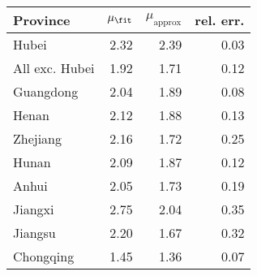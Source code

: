 \begin{tabular}{lrrr}
\hline
 Province       &   $\mu_{\mathrm{\fit}}$ &   $\mu_{\mathrm{approx}}$ &   rel. err. \\
\hline
 Hubei          &                    2.32 &                      2.39 &        0.03 \\
 All exc. Hubei &                    1.92 &                      1.71 &        0.12 \\
 Guangdong      &                    2.04 &                      1.89 &        0.08 \\
 Henan          &                    2.12 &                      1.88 &        0.13 \\
 Zhejiang       &                    2.16 &                      1.72 &        0.25 \\
 Hunan          &                    2.09 &                      1.87 &        0.12 \\
 Anhui          &                    2.05 &                      1.73 &        0.19 \\
 Jiangxi        &                    2.75 &                      2.04 &        0.35 \\
 Jiangsu        &                    2.20 &                      1.67 &        0.32 \\
 Chongqing      &                    1.45 &                      1.36 &        0.07 \\
\hline
\end{tabular}